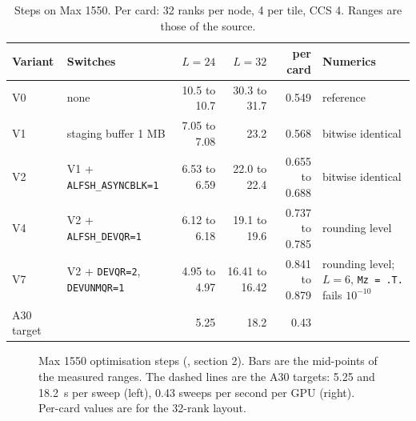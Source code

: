 \begin{table}[h]
\centering
\caption{Steps on Max 1550. Per card: 32 ranks per node, 4 per tile, CCS 4. Ranges are those of the source.}
\label{tab:intelsteps}
\small
\begin{tabularx}{\textwidth}{@{}llrrrX@{}}
\toprule
Variant & Switches & $L=24$ & $L=32$ & per card & Numerics \\
\midrule
V0 & none & 10.5 to 10.7 & 30.3 to 31.7 & 0.549 & reference \\ %
V1 & staging buffer 1 MB & 7.05 to 7.08 & 23.2 & 0.568 & bitwise identical \\
V2 & V1 + \texttt{ALFSH\_ASYNCBLK=1} & 6.53 to 6.59 & 22.0 to 22.4 & 0.655 to 0.688 & bitwise identical \\
V4 & V2 + \texttt{ALFSH\_DEVQR=1} & 6.12 to 6.18 & 19.1 to 19.6 & 0.737 to 0.785 & rounding level \\
V7 & V2 + \texttt{DEVQR=2}, \texttt{DEVUNMQR=1} & 4.95 to 4.97 & 16.41 to 16.42 & 0.841 to 0.879 & rounding level; $L=6$, \texttt{Mz = .T.} fails $10^{-10}$ \\
\midrule
A30 target & & 5.25 & 18.2 & 0.43 & \\
\bottomrule
\end{tabularx}
\end{table}

\begin{figure}[h]
\centering
{}
\caption{Max 1550 optimisation steps (, section 2). Bars are the mid-points of the measured ranges. The dashed lines are the A30 targets: 5.25 and 18.2~s per sweep (left), 0.43 sweeps per second per GPU (right). Per-card values are for the 32-rank layout.}
\label{fig:intel}
\end{figure}


